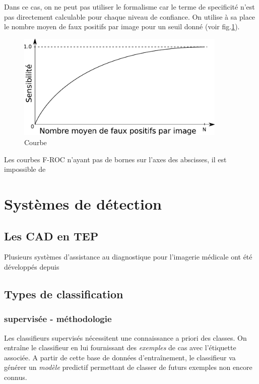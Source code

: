 Dans ce cas, on ne peut pas utiliser le formalisme \ROC car le terme de specificité n'est pas directement calculable pour chaque niveau de confiance. On utilise à sa place le nombre moyen de faux positifs par image pour un seuil donné (voir fig.\ref{fig:courbeFROC}).

\begin{figure}[h]
	
	\label{fig:courbeFROC}
	\begin{center}
	\includegraphics[width=10cm]{images/FROC}
	\end{center}
	\caption{Courbe \FROC}
\end{figure}

Les courbes F-ROC n'ayant pas de bornes sur l'axes des abscisses, il est impossible de 

\chapter{Systèmes de détection}

	\section{Les CAD en TEP}

Plusieurs systèmes d'assistance au diagnostique pour l'imagerie médicale ont été développés depuis  

	\section{Types de classification}
		\subsection{supervisée - méthodologie}

Les classifieurs supervisés nécessitent une connaissance a priori des classes. On entraîne le classifieur en lui fournissant des \emph{exemples} de cas avec l'étiquette associée. A partir de cette base de données d'entraînement, le classifieur va générer un \emph{modèle} predictif permettant de classer de futurs exemples non encore connus.

